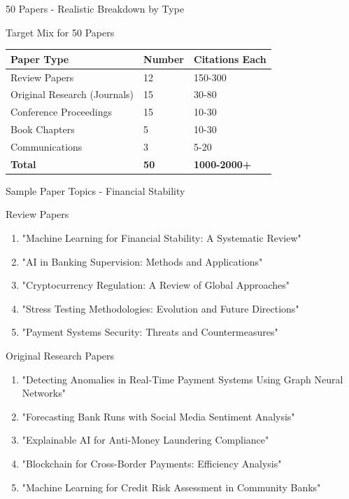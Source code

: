 \documentclass[11pt]{beamer}
\begin{document}
	\begin{frame}{50 Papers - Realistic Breakdown by Type}
		\scriptsize
		\begin{block}{Target Mix for 50 Papers}
			\centering
			\begin{tabular}{|p{4cm}|p{3cm}|p{3cm}|}
				\hline
				\textbf{Paper Type} & \textbf{Number} & \textbf{Citations Each} \\
				\hline
				Review Papers & 12 & 150-300 \\
				\hline
				Original Research (Journals) & 15 & 30-80 \\
				\hline
				Conference Proceedings & 15 & 10-30 \\
				\hline
				Book Chapters & 5 & 10-30 \\
				\hline
				Communications & 3 & 5-20 \\
				\hline
				\textbf{Total} & \textbf{50} & \textbf{1000-2000+} \\
				\hline
			\end{tabular}
		\end{block}
	\end{frame}
	
	\begin{frame}{Sample Paper Topics - Financial Stability}
		\scriptsize
		\begin{block}{Review Papers}
			\begin{enumerate}
				\item "Machine Learning for Financial Stability: A Systematic Review"
				\item "AI in Banking Supervision: Methods and Applications"
				\item "Cryptocurrency Regulation: A Review of Global Approaches"
				\item "Stress Testing Methodologies: Evolution and Future Directions"
				\item "Payment Systems Security: Threats and Countermeasures"
			\end{enumerate}
		\end{block}
		\begin{block}{Original Research Papers}
			\begin{enumerate}
				\item "Detecting Anomalies in Real-Time Payment Systems Using Graph Neural Networks"
				\item "Forecasting Bank Runs with Social Media Sentiment Analysis"
				\item "Explainable AI for Anti-Money Laundering Compliance"
				\item "Blockchain for Cross-Border Payments: Efficiency Analysis"
				\item "Machine Learning for Credit Risk Assessment in Community Banks"
			\end{enumerate}
		\end{block}
	\end{frame}
	
\end{document}
